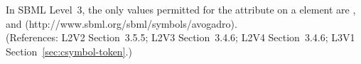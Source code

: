 In SBML Level~3, the only values permitted for the
 attribute on a  element are
,
 and
\val(http://www.sbml.org/sbml/symbols/avogadro).\\
(References: L2V2 Section~3.5.5; L2V3 Section~3.4.6; 
L2V4 Section~3.4.6; L3V1 Section~\ref{sec:csymbol-token}.)
